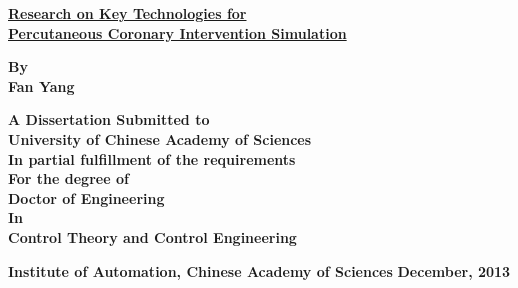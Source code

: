
{\renewcommand{\baselinestretch}{1.0}

\thispagestyle{empty} %

\vspace*{0.5cm} %
\begin{center}
  {\xiaoerhao \hei \textrm{\textbf{\underline{Research on Key Technologies for}\\
  \underline{Percutaneous Coronary Intervention Simulation}}}}
\end{center}

\vspace*{3.5cm} %
\begin{center}

\textsf{\sanhao \textrm{\textbf{By}}}\\
\textsf{\sanhao \textrm{\textbf{Fan Yang}}}

\vspace*{2.0cm} %
\sihao \textrm{\textbf{ A Dissertation Submitted to\\
University of Chinese Academy of Sciences\\
In partial fulfillment of the requirements\\
For the degree of\\
Doctor of Engineering\\
In\\
Control Theory and Control Engineering}}
\end{center}

\begin{center}
\vspace{1.5cm}
\sanhao \textrm{\textbf{Institute of Automation, Chinese Academy of Sciences}}
\sihao \textrm{\textbf{December, 2013}}
\end{center}
}